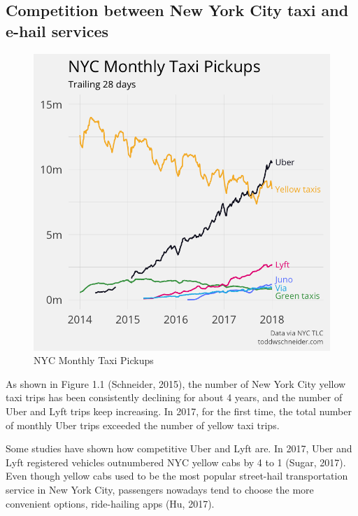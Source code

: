 \documentclass[12pt,twoside]{reedthesis}
\theoremstyle{definition}
\theoremstyle{definition}
\theoremstyle{definition}
\theoremstyle{remark}
\begin{document}
\subsection{Competition between New York City taxi and e-hail
services}\label{competition-between-new-york-city-taxi-and-e-hail-services}
\begin{figure}[h]

{\centering \includegraphics[width=5.33in]{figure/totals_by_car_type} 

}

\caption{NYC Monthly Taxi Pickups}\label{fig:totals-by-car-type}
\end{figure}
As shown in Figure 1.1 (Schneider, 2015), the number of New York City
yellow taxi trips has been consistently declining for about 4 years, and
the number of Uber and Lyft trips keep increasing. In 2017, for the
first time, the total number of monthly Uber trips exceeded the number
of yellow taxi trips.

Some studies have shown how competitive Uber and Lyft are. In 2017, Uber
and Lyft registered vehicles outnumbered NYC yellow cabs by 4 to 1
(Sugar, 2017). Even though yellow cabs used to be the most popular
street-hail transportation service in New York City, passengers nowadays
tend to choose the more convenient options, ride-hailing apps (Hu,
2017).
\end{document}
